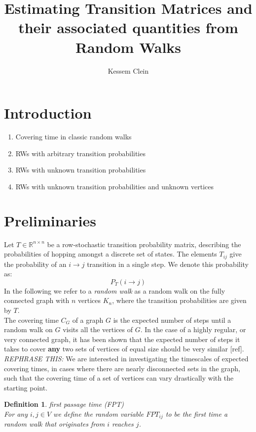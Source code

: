 \documentclass{article}
\title{Estimating Transition Matrices and their associated quantities from Random Walks}
\author{Kessem Clein}
\newtheorem{definition}{Definition}
\begin{document}
 
\maketitle

\section{Introduction}
\begin{enumerate}
    \item Covering time in classic random walks
    \item RWs with arbitrary transition probabilities
    \item RWs with unknown transition probabilities
    \item RWs with unknown transition probabilities and unknown vertices

    
\end{enumerate}


\section{Preliminaries}
Let $T \in \mathbb{R}^{n\times n}$ be a row-stochastic transition probability matrix, describing the probabilities of hopping amongst a discrete set of states. The elements $T_{ij}$ give the probability of an $i\rightarrow j$ transition in a single step. We denote this probability as: \\
     \[
        P_{T}(i\rightarrow j)
     \]
In the following we refer to a \textit{random walk} as a random walk on the fully connected graph with $n$ vertices $K_n$, where the transition probabilities are given by $T$. \\
The covering time $C_{G}$ of a graph $G$ is the expected number of steps until a random walk on $G$ visits all the vertices of $G$. 
In the case of a highly regular, or very connected graph, it has been shown that the expected number of steps it takes to cover \textbf{any} two sets of vertices of equal size should be very similar [ref]. \\
\textit{REPHRASE THIS: }We are interested in investigating the timescales of expected covering times, in cases where there are nearly disconnected sets in the graph, such that the covering time of a set of vertices can vary drastically  with the starting point.
\begin{definition}
    first passage time (FPT)\\
    For any $i, j \in V$ we define the random variable $FPT_{ij}$ to be the first time a random walk that originates from $i$ reaches $j$.
\end{definition}
\end{document}
